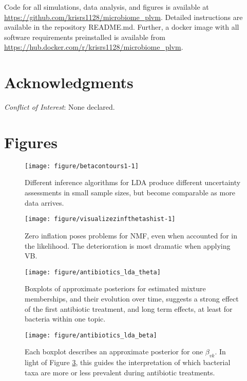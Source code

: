 \documentclass[oupdraft]{bio}
\begin{document}
Code for all simulations, data analysis, and figures is available at
\url{https://github.com/krisrs1128/microbiome_plvm}. Detailed instructions are
available in the repository README.md. Further, a docker image with all software
requirements preinstalled is available from
\url{https://hub.docker.com/r/krisrs1128/microbiome_plvm}.

\section*{Acknowledgments}

{\it Conflict of Interest}: None declared.




\section{Figures}

\begin{figure}[!p]
  \centering\texttt{[image: figure/betacontours1-1]}
  \caption{Different inference algorithms for LDA produce different uncertainty
    assessments in small sample sizes, but become comparable as more data arrives.}
  \label{fig:lda_contours}
\end{figure}

\begin{figure}[!p]
  \centering\texttt{[image: figure/visualizezinfthetashist-1]}
  \caption{Zero inflation poses problems for NMF, even when accounted for in the
    likelihood. The deterioration is most dramatic when applying VB.}
  \label{fig:zinf_thetas}
\end{figure}

\begin{figure}[!p]
  \centering\texttt{[image: figure/antibiotics\_lda\_theta]}
  \caption{Boxplots of approximate posteriors for estimated mixture memberships,
    and their evolution over time, suggests a strong effect of the first
    antibiotic treatment, and long term effects, at least for bacteria within
    one topic.}
  \label{fig:antibiotics_lda_theta}
\end{figure}

\begin{figure}[!p]
  \centering\texttt{[image: figure/antibiotics\_lda\_beta]}
  \caption{Each boxplot describes an approximate posterior for one $\beta_{vk}$.
    In light of Figure \ref{fig:antibiotics_lda_theta}, this guides the
    interpretation of which bacterial taxa are more or less prevalent during
    antibiotic treatments.}
  \label{fig:antibiotics_lda_beta}
\end{figure}
\end{document}

